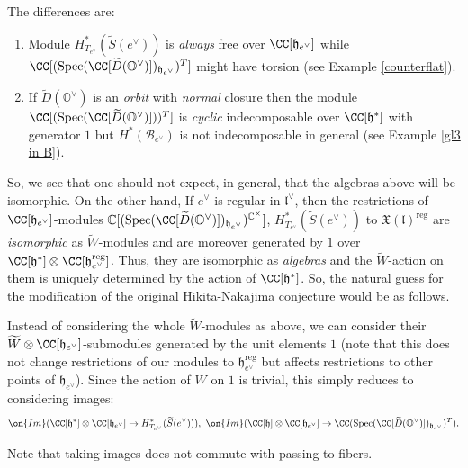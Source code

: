 \documentclass[12pt]{amsart}
\begin{document}
The differences are: 
\begin{enumerate}
    \item\label{issue_1} Module $H^*_{T_{e^\vee}}(\widetilde{S}(e^\vee))$ is {\emph{always}} free over $\CC[\mathfrak{h}_{e^\vee}]$ while $\CC[(\operatorname{Spec}(\CC[\widetilde{D}(\mathbb{O}^\vee)])_{\mathfrak{h}_{e^\vee}})^{T}]$ might have torsion (see Example \ref{counterflat}).

   \item\label{issue_2} If $\widetilde{D}(\mathbb{O}^\vee)$ is an {\emph{orbit}} with {\emph{normal}} closure then the module $\CC[(\operatorname{Spec}(\CC[\widetilde{D}(\mathbb{O}^\vee)]))^{T}]$ is {\emph{cyclic}} indecomposable over $\CC[\mathfrak{h}^*]$ with generator $1$ but $H^*(\mathcal{B}_{e^\vee})$ is not indecomposable in general (see Example \ref{gl3 in B}).
\end{enumerate}


So, we see that one should not expect, in general, that the algebras above will be isomorphic. 
On the other hand, If $e^\vee$ is regular in $\mathfrak{l}^\vee$, then the restrictions of $\CC[\mathfrak{h}_{e^\vee}]$-modules $\mathbb{C}[(\operatorname{Spec}(\CC[\widetilde{D}(\mathbb{O}^\vee)])_{\mathfrak{h}_{e^\vee}})^{\mathbb{C}^\times}]$, $H^*_{T_{e^\vee}}(\widetilde{S}(e^\vee))$ to $\mathfrak{X}(\mathfrak{l})^{\mathrm{reg}}$ are {\emph{isomorphic}} as $\widetilde{W}$-modules and are moreover generated by $1$ over $\CC[\mathfrak{h}^*] \otimes \CC[\mathfrak{h}_{e^\vee}^{\mathrm{reg}}]$. Thus, they are isomorphic as {\emph{algebras}} and the $\widetilde{W}$-action on them is uniquely determined by the action of $\CC[\mathfrak{h}^*]$.
So, the natural guess for the modification of the original Hikita-Nakajima conjecture would be as follows. 


Instead of considering the whole $\widetilde{W}$-modules as above, we can consider their $\widetilde{W} \otimes \CC[\mathfrak{h}_{e^\vee}]$-submodules generated by the unit elements $1$ (note that this does not change restrictions of our modules to $\mathfrak{h}_{e^\vee}^{\mathrm{reg}}$ but affects restrictions to other points of $\mathfrak{h}_{e^\vee}$). Since the action of $W$ on $1$ is trivial, this simply reduces to considering images:
\begin{equation*}
\on{Im}(\CC[\mathfrak{h}^*] \otimes \CC[\mathfrak{h}_{e^\vee}] \rightarrow H^*_{T_{e^\vee}}(\widetilde{S}(e^\vee))),~\on{Im}(\CC[\mathfrak{h}] \otimes \CC[\mathfrak{h}_{e^\vee}] \rightarrow \CC(\operatorname{Spec}(\CC[\widetilde{D}(\mathbb{O}^\vee)])_{\mathfrak{h}_{e^\vee}})^{T}).
\end{equation*}
\begin{warning}
Note that taking images does not commute with passing to fibers. 
\end{warning}
\end{document}
